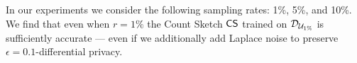 In our experiments we consider the following sampling rates: 1\%, 5\%, and 10\%. We find that even when $r=1\%$ the Count Sketch $\mathsf{CS}$ trained on $\mathcal{D}_{{\mathcal{U}_{1\%}}}$ is sufficiently accurate --- even if we additionally add Laplace noise to preserve $\epsilon=0.1$-differential privacy. 
















